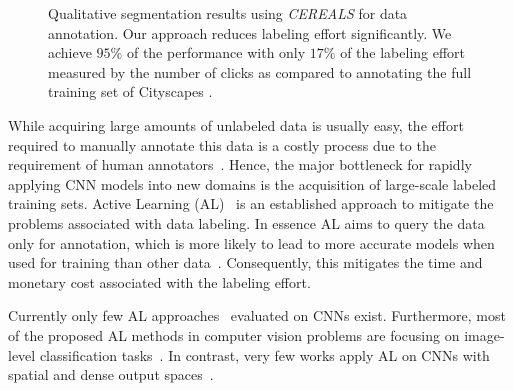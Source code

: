 \documentclass{bmvc2k}
\begin{document}
\begin{figure}[!ht]
\centering
\begin{subfigure}[Ground Truth \label{fig:teaser:gt}]{\texttt{[image: figures/teaser/gt]}} \end{subfigure}
\begin{subfigure}[Full training set (100\% labeling effort) \label{fig:teaser:100_percent}]{\texttt{[image: figures/teaser/100\_percent\_random\_semseg\_model]}}  \end{subfigure}
\begin{subfigure}[$17\%$ of the effort by random data selection \label{fig:teaser:20_percent_random}]{\texttt{[image: figures/teaser/20\_percent\_random\_semseg\_model\_overlayed]}} \end{subfigure}
\begin{subfigure}[$17\%$ of the effort using our approach. \label{fig:teaser:20_percent_method}]{\texttt{[image: figures/teaser/20\_percent\_al\_semseg\_model\_overlayed]}} \end{subfigure}
\caption{Qualitative segmentation results using \textit{CEREALS} for data annotation. Our approach reduces labeling effort significantly. We achieve $95\%$ of the performance with only $17\%$ of the labeling effort measured by the number of clicks as compared to annotating the full training set of Cityscapes \cite{DBLP:conf/cvpr/CordtsORREBFRS16}.}
\label{fig:teaser}
\vspace{-0.25cm}
\end{figure}

While acquiring large amounts of unlabeled data is usually easy, the effort required to manually annotate this data is a costly process due to the requirement of human annotators~\cite{DBLP:journals/ftcgv/KovashkaRFG16, DBLP:conf/cvpr/CordtsORREBFRS16}. Hence, the major bottleneck for rapidly applying CNN models into new domains is the acquisition of large-scale labeled training sets. Active Learning (AL)~\cite{DBLP:conf/nips/CohnGJ94} is an established approach to mitigate the problems associated with data labeling. In essence AL aims to query the data only for annotation, which is more likely to lead to more accurate models when used for training than other data~\cite{DBLP:journals/jmlr/TongK01, DBLP:conf/nips/TongK00,DBLP:conf/icml/GalIG17}. Consequently, this mitigates the time and monetary cost associated with the labeling effort.

Currently only few AL approaches~\cite{sener2018active, DBLP:conf/icml/GalIG17, DBLP:journals/corr/abs-1708-00489, DBLP:journals/tcsv/WangZLZL17, DBLP:conf/miccai/YangZCZC17} evaluated on CNNs exist. Furthermore, most of the proposed AL methods in computer vision problems are focusing on image-level classification tasks~\cite{sener2018active, DBLP:conf/cvpr/VijayanarasimhanG09,DBLP:conf/icml/KrishnamurthyAH17, DBLP:conf/icml/GalIG17,DBLP:journals/corr/abs-1708-00489, DBLP:journals/tcsv/WangZLZL17}. In contrast, very few works apply AL on CNNs with spatial and dense output spaces~\cite{DBLP:conf/miccai/YangZCZC17,DBLP:journals/corr/abs-1711-09168}.
\end{document}
